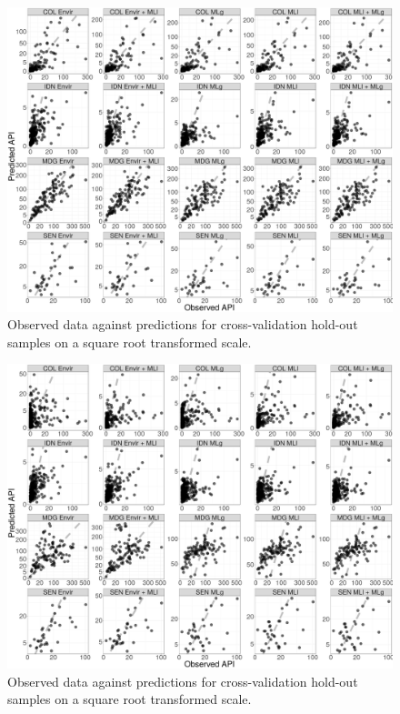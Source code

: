 \documentclass[11pt]{article}
\begin{document}
%

\begin{figure}
  \includegraphics[width=\textwidth]{figs/cv1_scatter.png}
\caption{
  Observed data against predictions for cross-validation hold-out samples on a square root transformed scale.
}
\label{f:scatter1}
\end{figure}


\begin{figure}
  \includegraphics[width=\textwidth]{figs/cv2_scatter.png}
\caption{
  Observed data against predictions for cross-validation hold-out samples on a square root transformed scale.
}
\label{f:scatter2}
\end{figure}
\end{document}
